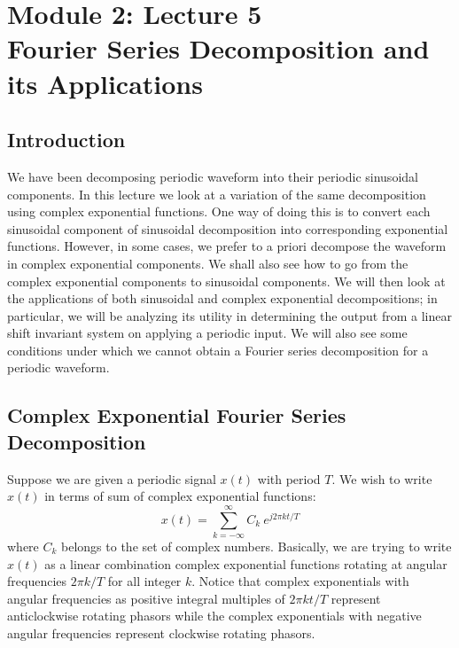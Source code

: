 \section{Module 2: Lecture 5\\Fourier Series Decomposition and its Applications}

\subsection{Introduction}
We have been decomposing periodic waveform into their periodic sinusoidal components. In this lecture we look at a variation of the same decomposition using complex exponential functions. One way of doing this is to convert each sinusoidal component of sinusoidal decomposition into corresponding exponential functions. However, in some cases, we prefer to a priori decompose the waveform in complex exponential components.
\newline
We shall also see how to go from the complex exponential components to sinusoidal components. We will then look at the applications of both sinusoidal and complex exponential decompositions; in particular, we will be analyzing its utility in determining the output from a linear shift invariant system on applying a periodic input.
We will also see some conditions under which we cannot obtain a Fourier series decomposition for a periodic waveform.

\subsection{Complex Exponential Fourier Series Decomposition}
Suppose we are given a periodic signal $x(t)$ with period $T$. We wish to write $x(t)$ in terms of sum of complex exponential functions:
$$ x(t) = \sum_{k=-\infty}^{\infty}{C_{k} \ e^{j2\pi kt/T}} $$
where $C_k$ belongs to the set of complex numbers.
Basically, we are trying to write $x(t)$ as a linear combination complex exponential functions rotating at angular frequencies $2\pi k/T$ for all integer $k$. Notice that complex exponentials with angular frequencies as positive integral multiples of $2\pi kt/T$ represent anticlockwise rotating phasors while the complex exponentials with negative angular frequencies represent clockwise rotating phasors.
\newline
